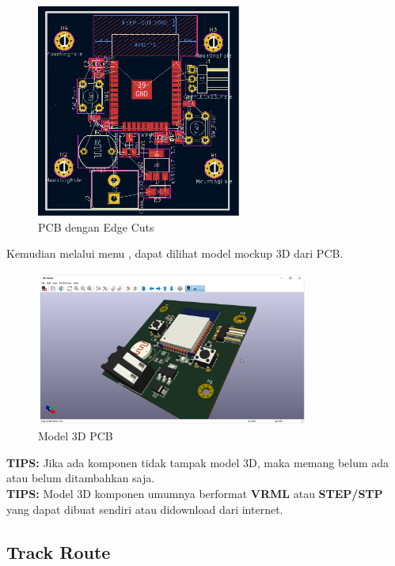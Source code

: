 \documentclass[12pt]{book}
\begin{document}
	\begin{figure}[!ht]
		\centering
		\includegraphics[width=0.6\textwidth]{images/pcb/pcb_10}
		\caption{PCB dengan Edge Cuts}
	\end{figure}

	Kemudian melalui menu , dapat dilihat model mockup 3D dari PCB.

	\begin{figure}[!ht]
		\centering
		\includegraphics[width=0.8\textwidth]{images/pcb/pcb_11}
		\caption{Model 3D PCB}
	\end{figure}

	\textbf{TIPS:} Jika ada komponen tidak tampak model 3D, maka memang belum ada atau belum ditambahkan saja.\\

	\textbf{TIPS:} Model 3D komponen umumnya berformat \textbf{VRML} atau \textbf{STEP/STP} yang dapat dibuat sendiri atau didownload dari internet.

	\newpage
	\subsection{Track Route}
\end{document}
